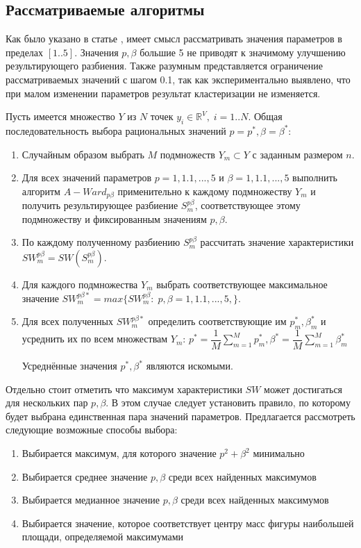 \documentclass[12pt,twoside,a4paper,tikz,border=5]{refart}
\begin{document}
		\subsection{Рассматриваемые алгоритмы}		
			Как было указано в статье \cite{choose-pb}, имеет смысл рассматривать значения параметров в пределах $ [1..5] $. Значения $ p, \beta $ большие 5 не приводят к значимому улучшению результирующего разбиения. Также разумным представляется ограничение рассматриваемых значений с шагом 0.1, так как экспериментально выявлено, что при малом изменении параметров результат кластеризации не изменяется. 
	
			Пусть имеется множество $ Y $ из $ N $ точек $ y_i \in \mathbb{R}^V,\;i=1..N $. Общая последовательность выбора рациональных значений $ p=p^*, \beta=\beta^* $:
			\begin{enumerate}
				\item Случайным образом выбрать $ M $ подмножеств $ Y_m \subset Y $ с заданным размером $ n $.
				\item Для всех значений параметров $ p=1,1.1,...,5 $ и $ \beta=1,1.1,...,5 $ выполнить алгоритм $ A-Ward_{p\beta} $ применительно к каждому подмножеству $ Y_m $ и получить результирующее разбиение $ S_m^{p\beta} $, соответствующее этому подмножеству и фиксированным значениям $ p,\beta $.
				\item По каждому полученному разбиению $ S_m^{p\beta} $ рассчитать значение характеристики $ SW_m^{p\beta}=SW(S_m^{p\beta}) $.
				\item Для каждого подмножества $ Y_m $ выбрать соответствующее максимальное значение $ SW_m^{p\beta*} = max\{SW_m^{p\beta}:\;p,\beta=1,1.1,...,5,\} $. 
				\item Для всех полученных $  SW_m^{p\beta*} $ определить соответствующие им $ p^*_m,\beta^*_m $ и усреднить их по всем множествам $ Y_m $: $ p^*=\dfrac{1}{M}\sum_{m=1}^{M}p^*_m, {\beta^*=\dfrac{1}{M}\sum_{m=1}^{M}\beta^*_m}$
				
				Усреднённые значения $ p^*, \beta^* $ являются искомыми.
				
			\end{enumerate}	
	
			Отдельно стоит отметить что максимум характеристики $ SW  $ может достигаться для нескольких пар $ p, \beta $. В этом случае следует установить правило, по которому будет выбрана единственная пара значений параметров. Предлагается рассмотреть следующие возможные способы выбора:
			\begin{enumerate}
				\item Выбирается максимум, для которого значение $ p^2 + \beta^2 $ минимально
				\item Выбирается среднее значение  $ p, \beta $ среди всех найденных максимумов
				\item Выбирается медианное значение  $ p, \beta $ среди всех найденных максимумов
				\item Выбирается значение, которое соответствует центру масс фигуры наибольшей площади, определяемой максимумами
			\end{enumerate}
			
\end{document}
